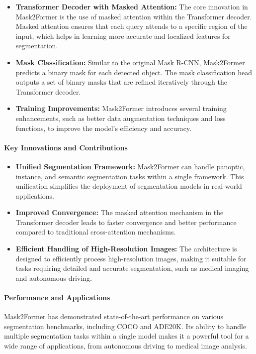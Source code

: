 \documentclass[12pt]{article}
\begin{document}
\begin{itemize}
    \item \textbf{Transformer Decoder with Masked Attention:} The core innovation in Mask2Former is the use of masked attention within the Transformer decoder. Masked attention ensures that each query attends to a specific region of the input, which helps in learning more accurate and localized features for segmentation.
    \item \textbf{Mask Classification:} Similar to the original Mask R-CNN, Mask2Former predicts a binary mask for each detected object. The mask classification head outputs a set of binary masks that are refined iteratively through the Transformer decoder.
    \item \textbf{Training Improvements:} Mask2Former introduces several training enhancements, such as better data augmentation techniques and loss functions, to improve the model's efficiency and accuracy.
\end{itemize}

\paragraph{Key Innovations and Contributions}

\begin{itemize}
    \item \textbf{Unified Segmentation Framework:} Mask2Former can handle panoptic, instance, and semantic segmentation tasks within a single framework. This unification simplifies the deployment of segmentation models in real-world applications.
    \item \textbf{Improved Convergence:} The masked attention mechanism in the Transformer decoder leads to faster convergence and better performance compared to traditional cross-attention mechanisms.
    \item \textbf{Efficient Handling of High-Resolution Images:} The architecture is designed to efficiently process high-resolution images, making it suitable for tasks requiring detailed and accurate segmentation, such as medical imaging and autonomous driving.
\end{itemize}

\paragraph{Performance and Applications}

Mask2Former has demonstrated state-of-the-art performance on various segmentation benchmarks, including COCO and ADE20K. Its ability to handle multiple segmentation tasks within a single model makes it a powerful tool for a wide range of applications, from autonomous driving to medical image analysis.
\end{document}
